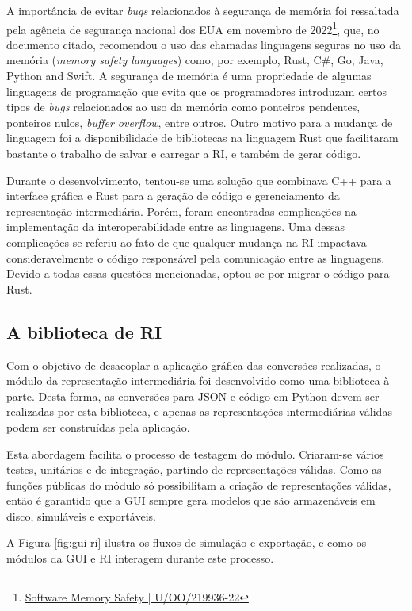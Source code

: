 \documentclass[
	12pt,				%
	openright,			%
	oneside,			%
	a4paper,			%
	main=brazil,
	english,			%
	]{ufsj-abntex2}
\begin{document}
A importância de evitar \textit{bugs} relacionados à segurança de memória foi ressaltada pela agência de segurança nacional dos EUA em novembro de 2022\footnote{\href{https://media.defense.gov/2022/Nov/10/2003112742/-1/-1/0/CSI_SOFTWARE_MEMORY_SAFETY.PDF}{Software Memory Safety | U/OO/219936-22}}, que, no documento citado, recomendou o uso das chamadas linguagens seguras no uso da memória (\textit{memory safety languages}) como, por exemplo, Rust, C\#, Go, Java, Python and Swift. A segurança de memória é uma propriedade de algumas linguagens de programação que evita que os programadores introduzam certos tipos de \textit{bugs} relacionados ao uso da memória como ponteiros pendentes, ponteiros nulos, \textit{buffer overflow}, entre outros. Outro motivo para a mudança de linguagem foi a disponibilidade de bibliotecas na linguagem Rust que facilitaram bastante o trabalho de salvar e carregar a RI, e também de gerar código. 

Durante o desenvolvimento, tentou-se uma solução que combinava C++ para a interface gráfica e Rust para a geração de código e gerenciamento da representação intermediária. Porém, foram encontradas complicações na implementação da interoperabilidade entre as linguagens. Uma dessas complicações se referiu ao fato de que qualquer mudança na RI impactava consideravelmente o código responsável pela comunicação entre as linguagens. Devido a todas essas questões mencionadas, optou-se por migrar o código para Rust. 


\subsection{A biblioteca de RI}
\label{sub:ri}

Com o objetivo de desacoplar a aplicação gráfica das conversões realizadas, o módulo da representação intermediária foi desenvolvido como uma biblioteca à parte. Desta forma, as conversões para JSON e código em Python devem ser realizadas por esta biblioteca, e apenas as representações intermediárias válidas podem ser construídas pela aplicação.

Esta abordagem facilita o processo de testagem do módulo. Criaram-se vários testes, unitários e de integração, partindo de representações válidas. Como as funções públicas do módulo só possibilitam a criação de representações válidas, então é garantido que a GUI sempre gera modelos que são armazenáveis em disco, simuláveis e exportáveis.

A Figura \ref{fig:gui-ri} ilustra os fluxos de simulação e exportação, e como os módulos da GUI e RI interagem durante este processo.
\end{document}
